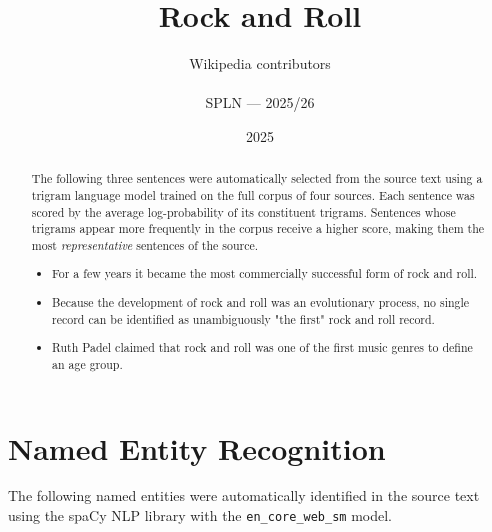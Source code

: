 \documentclass[12pt,a4paper]{article}
\title{\textbf{Rock and Roll}}
\author{Wikipedia contributors \\\\
\small SPLN --- 2025/26}
\date{2025}
\begin{document}
\maketitle

\begin{abstract}
The following three sentences were automatically selected from the source text
using a trigram language model trained on the full corpus of four sources.
Each sentence was scored by the average log-probability of its constituent
trigrams. Sentences whose trigrams appear more frequently in the corpus
receive a higher score, making them the most \emph{representative} sentences
of the source.

\begin{itemize}
  \item For a few years it became the most commercially successful form of rock and roll.
  \item Because the development of rock and roll was an evolutionary process, no single record can be identified as unambiguously "the first" rock and roll record.
  \item Ruth Padel claimed that rock and roll was one of the first music genres to define an age group.
\end{itemize}
\end{abstract}

\section{Named Entity Recognition}

The following named entities were automatically identified in the source
text using the spaCy NLP library with the \texttt{en\_core\_web\_sm} model.
\end{document}
